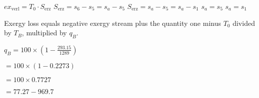 \( ex_{\text{verl}} = T_0 \cdot S_{\text{erz}} \)  
\( S_{\text{erz}} = s_6 - s_5 = s_a - s_5 \)  
\( S_{\text{erz}} = s_a - s_5 = s_a - s_1 \)  
\( s_a = s_5 \)  
\( s_a = s_1 \)

Exergy loss equals negative exergy stream plus the quantity one minus \( T_0 \) divided by \( T_B \), multiplied by \( q_B \).  

\( q_B = 100 \times (1 - \frac{293.15}{1289}) \)  

\( = 100 \times (1 - 0.2273) \)  

\( = 100 \times 0.7727 \)  

\( = 77.27 - 969.7 \)